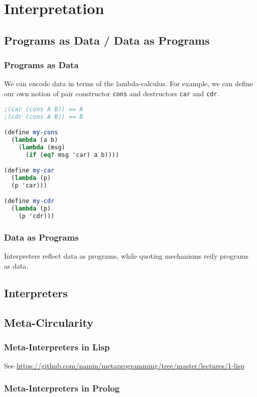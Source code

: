 \chapter{Interpretation}

\section{Programs as Data / Data as Programs}

\subsection{Programs as Data}

We can encode data in terms of the lambda-calculus. For example, we
can define our own notion of pair constructor {\tt cons} and
destructors {\tt car} and {\tt cdr}.

\begin{lstlisting}[language=Scheme]
;(car (cons A B)) == A
;(cdr (cons A B)) == B

(define my-cons
  (lambda (a b)
    (lambda (msg)
      (if (eq? msg 'car) a b))))

(define my-car
  (lambda (p)
  (p 'car)))

(define my-cdr
  (lambda (p)
    (p 'cdr)))
\end{lstlisting}

\subsection{Data as Programs}

Interpreters reflect data as programs,
while quoting mechanisms reify programs as data.

\section{Interpreters}

\section{Meta-Circularity}

\subsection{Meta-Interpreters in Lisp}

See \url{https://github.com/namin/metaprogramming/tree/master/lectures/1-lisp}

\subsection{Meta-Interpreters in Prolog}

